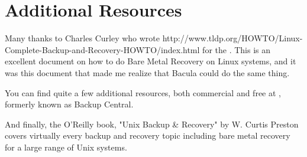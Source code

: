 \label{Resources}

\section{Additional Resources}

Many thanks to Charles Curley who wrote 
{http://www.tldp.org/HOWTO/Linux-Complete-Backup-and-Recovery-HOWTO/index.html%
} for the 
. This is an
excellent document on how to do Bare Metal Recovery on Linux systems, and it
was this document that made me realize that Bacula could do the same thing. 

You can find quite a few additional resources, both commercial and free at 
, formerly known as
Backup Central. 

And finally, the O'Reilly book, "Unix Backup \& Recovery" by W. Curtis
Preston covers virtually every backup and recovery topic including bare metal
recovery for a large range of Unix systems. 
